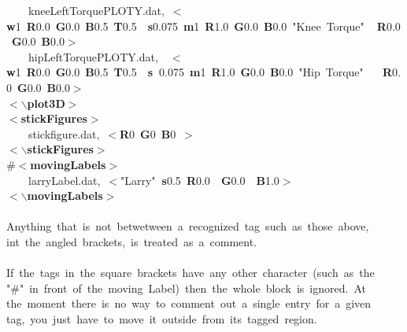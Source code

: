 \documentclass[singlecolumn,12pt]{article}
\newcommand{\hlstd}[1]{\textcolor[rgb]{0,0,0}{#1}}
\newcommand{\hlkey}[1]{\textcolor[rgb]{0,0,1}{\bf{#1}}}
\newcommand{\hlnum}[1]{\textcolor[rgb]{0.66,0,0.66}{#1}}
\newcommand{\hlstr}[1]{\textcolor[rgb]{1,0,0}{#1}}
\begin{document}
\begin{landscape}
{\hlstd{\ \ \ \ }kneeLeftTorquePLOTY.dat,\ }\hlkey{$<$w}\hlnum{1\ }\hlkey{R}\hlnum{0.0\ }\hlkey{G}\hlnum{0.0\ }\hlkey{B}\hlnum{0.5\ }\hlkey{T}\hlnum{0.5\hlstd{\ \ }}\hlkey{s}\hlnum{0.075\ }\hlkey{m}\hlnum{1\ }\hlkey{R}\hlnum{1.0\ }\hlkey{G}\hlnum{0.0\ }\hlkey{B}\hlnum{0.0\ }\hlkey{}\hlstr{"Knee\ Torque"}\hlkey{\hlstd{\ \ }R}\hlnum{0.0\ }\hlkey{G}\hlnum{0.0\ }\hlkey{B}\hlnum{0.0}\hlkey{$>$}\hlstd{\\
\hlstd{\ \ \ \ }hipLeftTorquePLOTY.dat,\hlstd{\ \ }}\hlkey{$<$w}\hlnum{1\ }\hlkey{R}\hlnum{0.0\ }\hlkey{G}\hlnum{0.0\ }\hlkey{B}\hlnum{0.5\ }\hlkey{T}\hlnum{0.5\hlstd{\ \ }}\hlkey{s\ }\hlnum{0.075\ }\hlkey{m}\hlnum{1\ }\hlkey{R}\hlnum{1.0\ }\hlkey{G}\hlnum{0.0\ }\hlkey{B}\hlnum{0.0\ }\hlkey{}\hlstr{"Hip\ Torque"}\hlkey{\hlstd{\ \ \ }R}\hlnum{0.0\ }\hlkey{G}\hlnum{0.0\ }\hlkey{B}\hlnum{0.0}\hlkey{$>$}\hlstd{\\
}\hlkey{$<$$\backslash$plot3D$>$}\hlstd{\\
}\hlkey{$<$stickFigures$>$}\hlstd{\\
\hlstd{\ \ \ \ }stickfigure.dat,\ }\hlkey{$<$R}\hlnum{0\ }\hlkey{G}\hlnum{0\ }\hlkey{B}\hlnum{0\ }\hlkey{$>$}\hlstd{\\
}\hlkey{$<$$\backslash$stickFigures$>$}\hlstd{\\
\#}\hlkey{$<$movingLabels$>$}\hlstd{\\
\hlstd{\ \ \ \ }larryLabel.dat,\ }\hlkey{$<$}\hlstr{"Larry"}\hlkey{\ s}\hlnum{0.5\ }\hlkey{R}\hlnum{0.0\hlstd{\ \ }}\hlkey{G}\hlnum{0.0\hlstd{\ \ }}\hlkey{B}\hlnum{1.0}\hlkey{$>$}\hlstd{\\
}\hlkey{$<$$\backslash$movingLabels$>$}\hlstd{\mbox{}\\
\\
Anything\ that\ is\ not\ betwetween\ a\ recognized\ tag\ such\ as\ those\ above,\\
int\ the\ angled\ brackets,\ is\ treated\ as\ a\ comment.\mbox{}\\
\\
If\ the\ tags\ in\ the\ square\ brackets\ have\ any\ other\ character\ (such\ as\ the\\
}\hlstr{"\#"}\hlstd{\ in\ front\ of\ the\ moving\ Label)\ then\ the\ whole\ block\ is\ ignored.\ At\\
the\ moment\ there\ is\ no\ way\ to\ comment\ out\ a\ single\ entry\ for\ a\ given\\
tag,\ you\ just\ have\ to\ move\ it\ outside\ from\ its\ tagged\ region.}\mbox{}\\
\mbox{}\\
\normalfont
\end{landscape}
\end{document}
